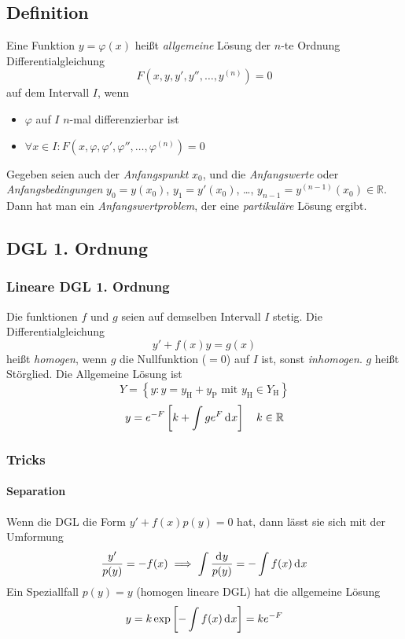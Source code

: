 \documentclass[margin=small, twocolumn]{hsrzf}
\numberwithin{equation}{subsection}
\begin{document}
\subsection{Definition}
Eine Funktion \(y = \varphi(x)\) hei{\ss}t \emph{allgemeine} L\"osung der \(n\)-te Ordnung Differentialgleichung
\[
    F(x, y, y', y'', \dots, y^{(n)}) = 0
\]
auf dem Intervall \(I\), wenn
\begin{itemize}
    \item \(\varphi\) auf \(I\) \(n\)-mal differenzierbar ist
    \item \(\forall x \in I: F(x, \varphi, \varphi', \varphi'', \dots, \varphi^{(n)}) = 0\)
\end{itemize}

Gegeben seien auch der \emph{Anfangspunkt}
\(x_0\), und
die \emph{Anfangswerte} oder \emph{Anfangsbedingungen}
\(y_0 = y(x_0)\),
\(y_1 = y'(x_0)\),
\dots,
\(y_{n-1} = y^{(n-1)}(x_0) \in \mathbb{R}\).
Dann hat man ein \emph{Anfangswertproblem}, der eine \emph{partikul\"are} L\"osung ergibt.

\subsection{DGL 1. Ordnung}
\subsubsection{Lineare DGL 1. Ordnung}
Die funktionen \(f\) und \(g\) seien auf demselben Intervall \(I\) stetig. Die Differentialgleichung
\[
    y' + f(x)y = g(x)
\]
hei{\ss}t \emph{homogen}, wenn \(g\) die Nullfunktion (\(=0\)) auf \(I\) ist, sonst \emph{inhomogen}. \(g\) hei{\ss}t St\"orglied.
Die Allgemeine L\"osung ist
\[
    Y = \left\{ y : y = y_\text{H} + y_\text{P} \text{ mit } y_\text{H} \in Y_\text{H}\right\}
\]
\[
    y = e^{-F}\left[k + \int ge^F\,\mathrm{d}^{} x\right]
    \quad k \in \mathbb{R}
\]

\subsubsection{Tricks}

\paragraph{Separation} Wenn die DGL die Form \(y' + f(x) p(y) = 0\) hat, dann l\"asst sie sich mit der Umformung
\[
    \frac{y'}{p(y)} = -f(x) \implies \int \frac{\mathrm{d}^{} y}{p(y)} = - \int f(x) \,\mathrm{d}^{} x
\]
Ein Speziallfall \(p(y) = y\) (homogen lineare DGL) hat die allgemeine L\"osung
\[
    y = k\exp\left[-\int f(x) \,\mathrm{d}^{} x \right] = k{ e}^{-F}
\]
\end{document}

